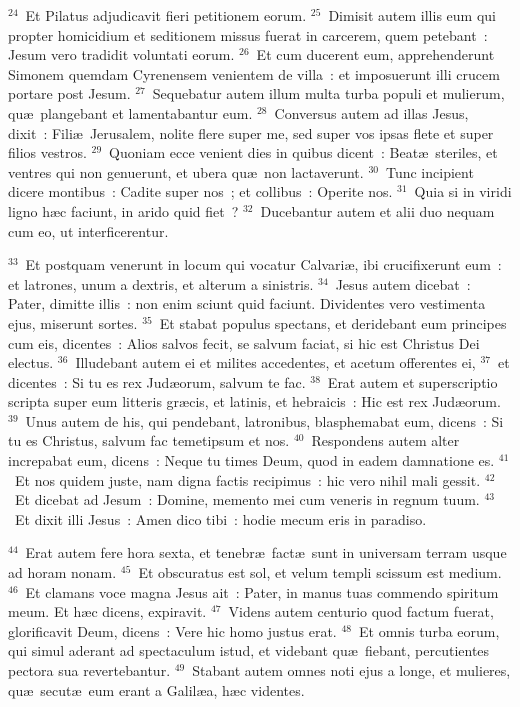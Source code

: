 ${}^{24}$~Et Pilatus adjudicavit fieri petitionem eorum.
${}^{25}$~Dimisit autem illis eum qui propter homicidium et seditionem missus fuerat in carcerem, quem petebant~: Jesum vero tradidit voluntati eorum.
${}^{26}$~Et cum ducerent eum, apprehenderunt Simonem quemdam Cyrenensem venientem de villa~: et imposuerunt illi crucem portare post Jesum.
${}^{27}$~Sequebatur autem illum multa turba populi et mulierum, qu\ae\ plangebant et lamentabantur eum.
${}^{28}$~Conversus autem ad illas Jesus, dixit~: Fili\ae\ Jerusalem, nolite flere super me, sed super vos ipsas flete et super filios vestros.
${}^{29}$~Quoniam ecce venient dies in quibus dicent~: Beat\ae\ steriles, et ventres qui non genuerunt, et ubera qu\ae\ non lactaverunt.
${}^{30}$~Tunc incipient dicere montibus~: Cadite super nos~; et collibus~: Operite nos.
${}^{31}$~Quia si in viridi ligno h\ae c faciunt, in arido quid fiet~?
${}^{32}$~Ducebantur autem et alii duo nequam cum eo, ut interficerentur.


${}^{33}$~Et postquam venerunt in locum qui vocatur Calvari\ae , ibi crucifixerunt eum~: et latrones, unum a dextris, et alterum a sinistris.
${}^{34}$~Jesus autem dicebat~: Pater, dimitte illis~: non enim sciunt quid faciunt. Dividentes vero vestimenta ejus, miserunt sortes.
${}^{35}$~Et stabat populus spectans, et deridebant eum principes cum eis, dicentes~: Alios salvos fecit, se salvum faciat, si hic est Christus Dei electus.
${}^{36}$~Illudebant autem ei et milites accedentes, et acetum offerentes ei,
${}^{37}$~et dicentes~: Si tu es rex Jud\ae orum, salvum te fac.
${}^{38}$~Erat autem et superscriptio scripta super eum litteris gr\ae cis, et latinis, et hebraicis~: Hic est rex Jud\ae orum.
${}^{39}$~Unus autem de his, qui pendebant, latronibus, blasphemabat eum, dicens~: Si tu es Christus, salvum fac temetipsum et nos.
${}^{40}$~Respondens autem alter increpabat eum, dicens~: Neque tu times Deum, quod in eadem damnatione es.
${}^{41}$~Et nos quidem juste, nam digna factis recipimus~: hic vero nihil mali gessit.
${}^{42}$~Et dicebat ad Jesum~: Domine, memento mei cum veneris in regnum tuum.
${}^{43}$~Et dixit illi Jesus~: Amen dico tibi~: hodie mecum eris in paradiso.


${}^{44}$~Erat autem fere hora sexta, et tenebr\ae\ fact\ae\ sunt in universam terram usque ad horam nonam.
${}^{45}$~Et obscuratus est sol, et velum templi scissum est medium.
${}^{46}$~Et clamans voce magna Jesus ait~: Pater, in manus tuas commendo spiritum meum. Et h\ae c dicens, expiravit.
${}^{47}$~Videns autem centurio quod factum fuerat, glorificavit Deum, dicens~: Vere hic homo justus erat.
${}^{48}$~Et omnis turba eorum, qui simul aderant ad spectaculum istud, et videbant qu\ae\ fiebant, percutientes pectora sua revertebantur.
${}^{49}$~Stabant autem omnes noti ejus a longe, et mulieres, qu\ae\ secut\ae\ eum erant a Galil\ae a, h\ae c videntes.


